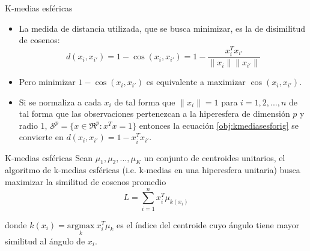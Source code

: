 \documentclass{beamer}
\begin{document}

\begin{frame}{K-medias esféricas}
  \begin{itemize}
    \item   La medida de distancia utilizada, que se busca minimizar,  es la de disimilitud de cosenos:
  \begin{equation}\label{obj:kmediasesforig}
    d(x_{i},x_{i'})= 1- \cos(x_{i},x_{i'}) = 1-\frac{x_{i}^Tx_{i'}}{\|x_{i}\|\|x_{i'}\|}
  \end{equation}
    \item Pero minimizar $1- \cos(x_{i},x_{i'})$ es equivalente a maximizar $\cos(x_{i},x_{i'})$. 
    \item Si se normaliza a cada $x_{i}$ de tal forma que $\|x_{i}\|=1$ para $i = 1,2,...,n$ de tal forma que las observaciones pertenezcan a la hiperesfera de dimensión $p$ y radio 1, $\mathcal{S}^p =\lbrace x \in \Re^{p} : x^T x=1 \rbrace $ entonces la ecuación \ref{obj:kmediasesforig} se convierte en $d(x_{i},x_{i'}) = 1- x_{i}^Tx_{i'}$. 
  \end{itemize}
\end{frame}

\begin{frame}{K-medias esféricas}
Sean ${\mu_{1},\mu_{2},...,\mu_{K}}$ un conjunto de centroides unitarios, el algoritmo de k-medias esféricas (i.e. k-medias en una hiperesfera unitaria) busca maximizar la similitud de cosenos promedio 
\begin{equation}\label{eq:kmediasesf}
L = \sum_{i=1}^{n} x_{i}^T \mu_{k(x_{i})} 
\end{equation}

donde $k(x_{i})=\underset{k}{\textrm{argmax}} \: x_{i}^T \mu_{k}  $ es el índice del centroide cuyo ángulo tiene mayor similitud al ángulo de $x_{i}$.
\end{frame}
\end{document}
